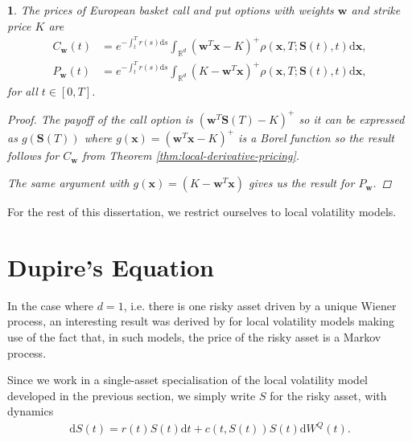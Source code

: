 \documentclass[english]{article}
\newcommand{\comment}[1]{\color{blue}#1\color{black}}
\numberwithin{equation}{section}
\numberwithin{figure}{section}
\theoremstyle{bolddescit}
\theoremstyle{definition}
\theoremstyle{definition}
\theoremstyle{plain}
\theoremstyle{plain}
\newtheorem{corollary}[theorem]{\protect\corollaryname}
\theoremstyle{bolddesc}
\theoremstyle{plain}
\theoremstyle{remark}
\providecommand{\corollaryname}{Corollary}
\begin{document}
\begin{corollary}\label{cor:local-option-pricing}
  The prices of European basket call and put options with weights $\mathbf{w}$ and strike price $K$ are
  \begin{align*}
    C_\mathbf{w}(t)
    &= e^{-\int_t^T r(s) \mathrm{d}s} \int_{\mathbb{R}^d} \left(\mathbf{w}^T\mathbf{x} - K\right)^+ \rho(\mathbf{x},T;\mathbf{S}(t),t) \mathrm{d}\mathbf{x},\\
    P_\mathbf{w}(t)
    &= e^{-\int_t^T r(s) \mathrm{d}s} \int_{\mathbb{R}^d} \left(K - \mathbf{w}^T\mathbf{x}\right)^+ \rho(\mathbf{x},T;\mathbf{S}(t),t) \mathrm{d}\mathbf{x},
  \end{align*}
  for all $t \in [0,T]$.

  \begin{proof}
    The payoff of the call option is $(\mathbf{w}^T \mathbf{S}(T) - K)^+$ so it can be expressed as $g(\mathbf{S}(T))$ where $g(\mathbf{x}) = (\mathbf{w}^T \mathbf{x} - K)^+$ is a Borel function so the result follows for $C_\mathbf{w}$ from Theorem \ref{thm:local-derivative-pricing}.

    The same argument with $g(\mathbf{x}) = (K - \mathbf{w}^T \mathbf{x})$ gives us the result for $P_\mathbf{w}$.
  \end{proof}
\end{corollary}


For the rest of this dissertation, we restrict ourselves to local volatility models.

\section{Dupire's Equation}


In the case where $d=1$, i.e. there is one risky asset driven by a unique Wiener process, an interesting result was derived by \textcite{dupire_pricing_1993} for local volatility models making use of the fact that, in such models, the price of the risky asset is a Markov process.

Since we work in a single-asset specialisation of the local volatility model developed in the previous section, we simply write $S$ for the risky asset, with dynamics
\begin{align*}
  \mathrm{d}S(t) = r(t) S(t) \mathrm{d}t + c(t,S(t)) S(t) \mathrm{d}W^Q(t).
\end{align*}
\end{document}
